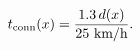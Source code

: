 \documentclass[border=2pt,12pt]{standalone}
\begin{document}
$\displaystyle t_{\rm conn}(x)=\frac{1.3\,d(x)}{25~\text{km/h}}.$
\end{document}

